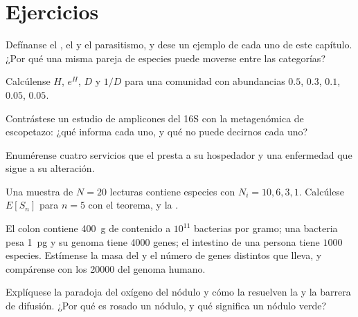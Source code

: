 \section{Ejercicios}

\begin{exercise}[$\star$]\label{exo:b3:microbiomes:1}
Defínanse el , el  y el parasitismo, y dese un
ejemplo de cada uno de este capítulo. ¿Por qué una misma pareja de
especies puede moverse entre las categorías?
\end{exercise}

\begin{exercise}[$\star$]\label{exo:b3:microbiomes:2}
Calcúlense $H$, $e^{H}$, $D$ y $1/D$ para una comunidad con abundancias
$0.5$, $0.3$, $0.1$, $0.05$, $0.05$.
\end{exercise}

\begin{exercise}[$\star$]\label{exo:b3:microbiomes:3}
Contrástese un estudio de amplicones del 16S con la metagenómica de
escopetazo: ¿qué informa cada uno, y qué no puede decirnos cada uno?
\end{exercise}

\begin{exercise}[$\star$]\label{exo:b3:microbiomes:4}
Enumérense cuatro servicios que el  presta a su
hospedador y una enfermedad que sigue a su alteración.
\end{exercise}

\begin{exercise}[$\star\star$]\label{exo:b3:microbiomes:5}
Una muestra de $N = 20$ lecturas contiene especies con
$N_{i} = 10, 6, 3, 1$. Calcúlese $E[S_{n}]$ para $n = 5$ con el teorema,
y la .
\end{exercise}

\begin{exercise}[$\star\star$]\label{exo:b3:microbiomes:6}
El colon contiene \qty{400}{g} de contenido a $10^{11}$ bacterias por
gramo; una bacteria pesa \qty{1}{pg} y su genoma tiene \num{4000} genes;
el intestino de una persona tiene $1000$ especies. Estímense la masa del
 y el número de genes distintos que lleva, y compárense con los
\num{20000} del genoma humano.
\end{exercise}

\begin{exercise}[$\star\star$]\label{exo:b3:microbiomes:7}
Explíquese la paradoja del oxígeno del nódulo y cómo la resuelven la
 y la barrera de difusión. ¿Por qué es rosado un nódulo, y
qué significa un nódulo verde?
\end{exercise}

